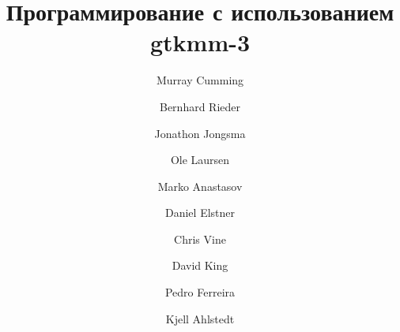 \begin{titlepage}
	
		\author{Murray Cumming \and Bernhard Rieder \and Jonathon Jongsma
			\and Ole Laursen
			\and Marko Anastasov
			\and Daniel Elstner
			\and Chris Vine
			\and David King
			\and Pedro Ferreira
			\and Kjell Ahlstedt} 
		\title{Программирование с использованием gtkmm-3}
		
		
	\maketitle
\end{titlepage}